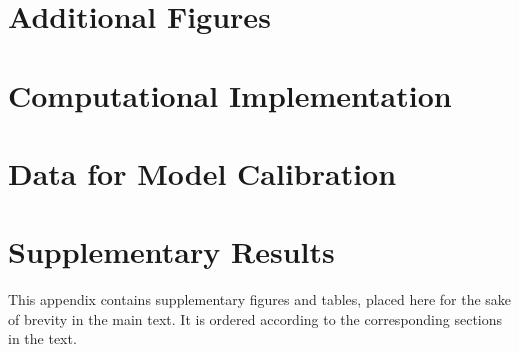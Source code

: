 \documentclass[a4paper,12pt]{article} %
\numberwithin{equation}{section} %
\numberwithin{figure}{section}
\numberwithin{table}{section}
\begin{document}
\newpage
\begin{refsection}
\thispagestyle{plain}
\renewcommand*{\thepage}{A-\arabic{page}} %
\begin{appendices}
\section{Additional Figures}
\label{sec-app:full}

\section{Computational Implementation}
\label{sec-app:codes}



\section{Data for Model Calibration}
\label{sec-app:data}


\section{Supplementary Results}
\label{sec-app:figures}

This appendix contains supplementary figures and tables, placed here for the sake of brevity in the main text. It is ordered according to the corresponding sections in the text.



\newpage
\end{appendices}
\thispagestyle{plain}
\renewcommand*{\thepage}{A-\Roman{page}} %

\printbibliography[heading=subbibliography, title={Appendix References}]
\thispagestyle{plain}
\cleardoublepage %

\end{refsection}
\end{document}
